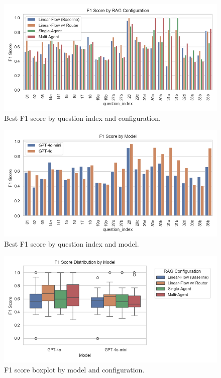                 \begin{figure}[H]
                    \centering
                    \includegraphics[scale=0.75]{images_exp2/best_f1_by_question_index_and_configuration.png}
                    \caption{Best F1 score by question index and configuration.}
                    \label{fig:best_f1_by_question_index_and_configuration}
                \end{figure}

                \begin{figure}[H]
                    \centering
                    \includegraphics[scale=0.75]{images_exp2/best_f1_by_question_index_and_model.png}
                    \caption{Best F1 score by question index and model.}
                    \label{fig:best_f1_by_question_index_and_model}
                \end{figure}

                \begin{figure}[H]
                    \centering
                    \includegraphics[scale=0.75]{images_exp2/f1_boxplot_by_model_and_configuration.png}
                    \caption{F1 score boxplot by model and configuration.}
                    \label{fig:f1_boxplot_by_model_and_configuration}
                \end{figure}

